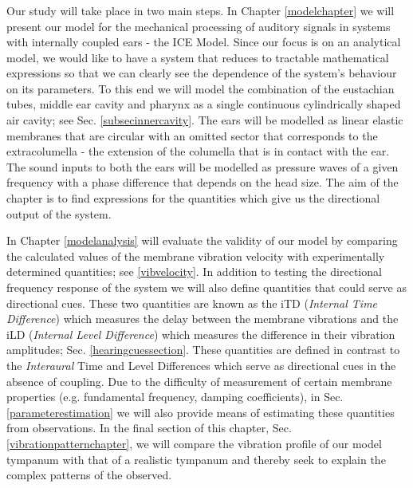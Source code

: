 \subsubsection*{}
Our study will take place in two main steps. In Chapter \ref{modelchapter} we will
present our model for the mechanical processing of auditory signals in systems with internally coupled ears - the ICE Model.
Since our focus is on an analytical model, we would like to have a system that reduces to tractable mathematical expressions
so that we can clearly see the dependence of the system's behaviour on its parameters. To this end we will model the 
combination of the eustachian tubes, middle ear cavity and pharynx as a single continuous cylindrically shaped air cavity; see
Sec. \ref{subsecinnercavity}. The ears will be modelled as linear elastic membranes that are circular with an omitted sector
that corresponds to the extracolumella - the extension of the columella that is in contact with the ear. The
sound inputs to both the ears will be modelled as pressure waves of a given frequency with a phase difference that depends on the 
head size. The aim of the chapter is to find expressions for the quantities which give us the directional output of the system.

In Chapter \ref{modelanalysis} will evaluate the validity of our model
by comparing the calculated values of the membrane vibration velocity with experimentally determined quantities; 
see \ref{vibvelocity}. In addition to testing the directional frequency
response of the system we will also define quantities that could serve as directional cues. These two quantities are known
as the iTD (\emph{Internal Time Difference}) which measures the delay between the membrane vibrations and the iLD (\emph{Internal Level
Difference}) which measures the difference in their vibration amplitudes; Sec. \ref{hearingcuessection}. These quantities are defined in contrast to the
\emph{Interaural} Time and Level  Differences which serve as directional cues in the absence of coupling. Due to the difficulty of measurement of certain membrane
properties (e.g. fundamental frequency, damping coefficients), in Sec. \ref{parameterestimation} we will also provide means of estimating these quantities from observations.
In the final section of this chapter, Sec. \ref{vibrationpatternchapter}, we will compare the vibration profile of our model tympanum with that of a realistic tympanum and thereby
seek to explain the complex patterns of the observed.
